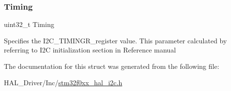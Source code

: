 \subsubsection{\texorpdfstring{Timing}{Timing}}
{\footnotesize\ttfamily uint32\+\_\+t Timing}

Specifies the I2\+C\+\_\+\+T\+I\+M\+I\+N\+G\+R\+\_\+register value. This parameter calculated by referring to I2C initialization section in Reference manual 

The documentation for this struct was generated from the following file\+:\begin{DoxyCompactItemize}
\item 
H\+A\+L\+\_\+\+Driver/\+Inc/\hyperlink{stm32f0xx__hal__i2c_8h}{stm32f0xx\+\_\+hal\+\_\+i2c.\+h}\end{DoxyCompactItemize}

